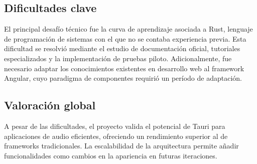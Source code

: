 \documentclass[11pt, a4paper]{article}
\begin{document}
        \subsection{Dificultades clave}

        El principal desafío técnico fue la curva de aprendizaje asociada a Rust, lenguaje de programación de sistemas con el que no se contaba experiencia previa. Esta dificultad se resolvió mediante el estudio de documentación oficial, tutoriales especializados y la implementación de pruebas piloto. Adicionalmente, fue necesario adaptar los conocimientos existentes en desarrollo web al framework Angular, cuyo paradigma de componentes requirió un período de adaptación.

        \subsection{Valoración global}

        A pesar de las dificultades, el proyecto valida el potencial de Tauri para aplicaciones de audio eficientes, ofreciendo un rendimiento superior al de frameworks tradicionales. La escalabilidad de la arquitectura permite añadir funcionalidades como cambios en la apariencia en futuras iteraciones.

\printbibliography
\end{document}
